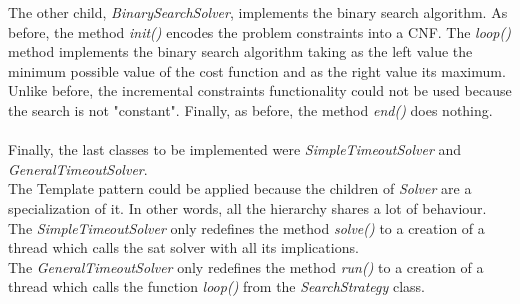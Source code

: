 The other child, \emph{BinarySearchSolver}, implements the binary search algorithm. As before, the method \emph{init()} encodes the problem constraints into a CNF. The \emph{loop()} method implements the binary search algorithm taking as the left value the minimum possible value of the cost function and as the right value its maximum. Unlike before, the incremental constraints functionality could not be used because the search is not "constant".  Finally, as before, the method \emph{end()} does nothing.  \\\\
Finally, the last classes to be implemented were \emph{SimpleTimeoutSolver} and \emph{GeneralTimeoutSolver}. \\
The Template pattern \cite{Gamma} could be applied because the children of \emph{Solver} are a specialization of it. In other words, all the hierarchy shares a lot of behaviour.  \\
The \emph{SimpleTimeoutSolver} only redefines the method \emph{solve()} to a creation of a thread which calls the sat solver with all its implications. \\
The \emph{GeneralTimeoutSolver} only redefines the method \emph{run()} to a creation of a thread which calls the function \emph{loop()} from the \emph{SearchStrategy} class.  


